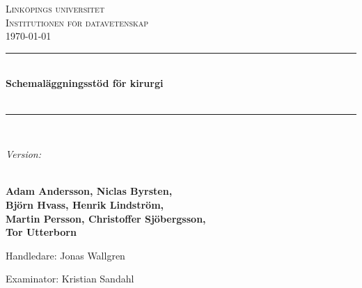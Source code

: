 \begin{titlepage} %
	\newcommand{\HRule}{\rule{\linewidth}{0.5mm}} %

	\center %


	\textsc{\LARGE Linköpings universitet \\ \vspace{0.2em} Institutionen för datavetenskap }\\[2cm]

    \large\today

    \vspace{1cm}



	\HRule\\[0.4cm]

	{\huge\bfseries Schemaläggningsstöd för  kirurgi \vspace{.1em} \\ \ftitle }\\[0.4cm] %

	\HRule\\[1cm]


	\begin{minipage}{0.7\textwidth}
			\large
            \emph{Version: \fversion}
            \vspace{1em}

            \textbf{\\Adam Andersson, Niclas Byrsten, \\Björn Hvass, Henrik Lindström, \\Martin Persson, Christoffer Sjöbergsson, \\Tor Utterborn}


            \vspace{1em}

            Handledare: Jonas Wallgren

            Examinator: Kristian Sandahl
	\end{minipage}


\end{titlepage}
